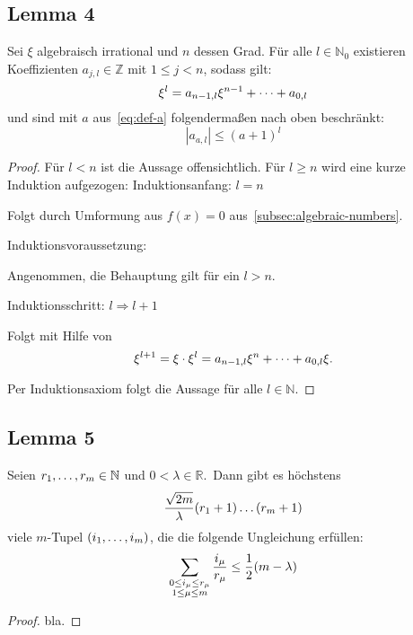 \subsection{Lemma 4}
    \label{subsec:lemma4}
    \textrm{Sei $\xi$ algebraisch irrational und $n$ dessen Grad. Für alle $l \in \mathbb{N}_0$ existieren
    Koeffizienten $a_{j,l} \in \mathbb{Z}$ mit $1 \leq j < n$, sodass gilt:}
    \begin{equation*}
        \xi^l = a_{n-1, l}\xi^{n-1} + \dots + a_{0,l}
    \end{equation*}
    \textrm{und sind mit $a$ aus~\eqref{eq:def-a} folgendermaßen nach oben beschränkt:}
    \begin{equation*}
        \left| a_{a,l} \right| \leq (a + 1)^l
    \end{equation*}
    \begin{proof}
        \textrm{Für $l < n$ ist die Aussage offensichtlich. Für $l \geq n$ wird eine kurze Induktion aufgezogen:}
        \newline
        Induktionsanfang: $l = n$
        \begin{indentpar}
            Folgt durch Umformung aus $f(x) = 0$ aus~\ref{subsec:algebraic-numbers}.
        \end{indentpar}
        Induktionsvoraussetzung:
        \begin{indentpar}
            \textrm{Angenommen, die Behauptung gilt für ein $l > n$.}
        \end{indentpar}
        Induktionsschritt: $l \Rightarrow l+1$
        \begin{indentpar}
            Folgt mit Hilfe von
            \begin{equation*}
                \xi^{l+1} = \xi \cdot \xi^l = a_{n-1, l}\xi^{n} + \dots + a_{0,l} \xi.
            \end{equation*}
        \end{indentpar}
        \textrm{Per Induktionsaxiom folgt die Aussage für alle $l \in \mathbb{N}$.}
    \end{proof}

\subsection{Lemma 5}
    \label{subsec:lemma5}
    \textrm{Seien $r_1, \dots, r_m \in \mathbb{N}$ und $0 < \lambda \in \mathbb{R}$.\ Dann gibt es höchstens}
    \begin{equation*}
        \frac{\sqrt{2m}}{\lambda} (r_1 + 1) \dots (r_m +1)
    \end{equation*}
    \textrm{viele $m$-Tupel $(i_1, \dots, i_m)$, die die folgende Ungleichung erfüllen:}
    \begin{equation*}
        \sum_{\substack{0 \leq i_\mu \leq r_\mu \\ 1 \leq \mu \leq m}} \frac{i_\mu}{r_\mu} \leq \frac{1}{2} (m - \lambda)
    \end{equation*}
    \begin{proof}
        bla. \shine
    \end{proof}
    
